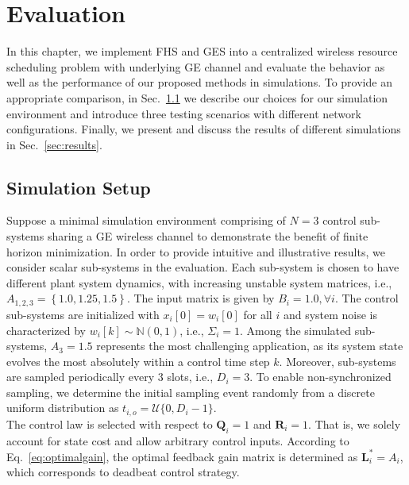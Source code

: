 \chapter{Evaluation}

In this chapter, we implement FHS and GES into a centralized wireless resource
scheduling problem with underlying GE channel and evaluate the behavior as well
as the performance of our proposed methods in simulations. To provide an
appropriate comparison, in Sec.~\ref{sec:setup} we describe our choices for
our simulation environment and introduce three testing scenarios with different
network configurations. Finally, we present and discuss the results of different
simulations in Sec.~\ref{sec:results}. 

\section{Simulation Setup} \label{sec:setup}

Suppose a minimal simulation environment comprising of $N=3$ control
sub-systems sharing a GE wireless channel to demonstrate the benefit of finite
horizon minimization. In order to provide intuitive and illustrative results, we
consider scalar sub-systems in the evaluation. Each sub-system is chosen to have
different plant system dynamics, with increasing unstable system matrices, i.e.,
$A_{1,2,3} = \left\{1.0, 1.25, 1.5\right\}$. The input matrix is given by $B_i =
1.0, \forall i$. The control sub-systems are initialized with $x_i[0] = w_i[0]$
for all $i$ and system noise is characterized by $w_i[k]\sim \mathbb{N}(0,1)$,
i.e., $\Sigma_i=1$. Among the simulated sub-systems, $A_3=1.5$ represents the
most challenging application, as its system state evolves the most absolutely
within a control time step $k$. Moreover, sub-systems are sampled periodically
every 3 slots, i.e., $D_i=3$. To enable non-synchronized sampling, we determine
the initial sampling event randomly from a discrete uniform distribution as
$t_{i,o} = \mathcal{U}\{0, D_i-1\}$. \\
The control law is selected with respect to $\boldsymbol{Q}_i = 1$ and
$\boldsymbol{R}_i = 1$. That is, we solely account for state cost and allow
arbitrary control inputs. According to Eq.~\eqref{eq:optimalgain}, the optimal
feedback gain matrix is determined as $\boldsymbol{L}^*_i = A_i$, which
corresponds to deadbeat control strategy. 

